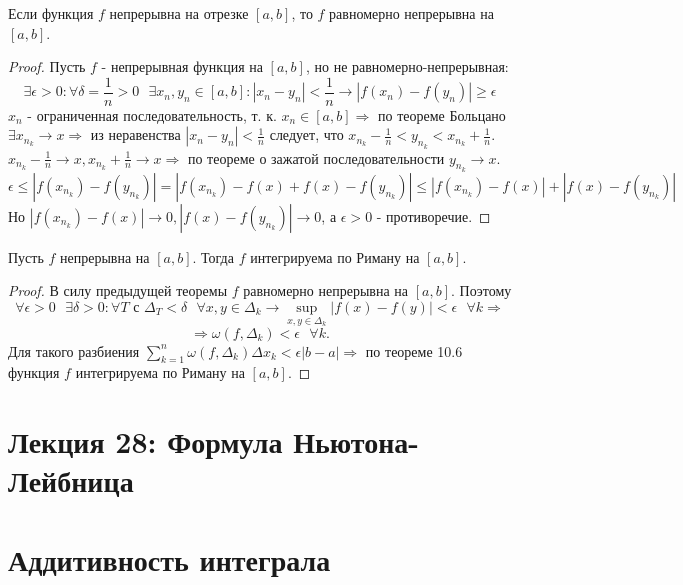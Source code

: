     \begin{theorem}[Кантора]
    	Если функция $f$ непрерывна на отрезке $[a, b]$, то $f$ равномерно непрерывна на $[a, b]$.
    \end{theorem}
    
    \begin{proof}
    	Пусть $f$ - непрерывная функция на $[a, b]$, но не равномерно-непрерывная:
    	\[ \exists \epsilon > 0: \forall \delta = \frac{1}{n} > 0 \text{ } \exists x_n, y_n \in [a, b]: |x_n - y_n| < \frac{1}{n} \rightarrow |f(x_n) - f(y_n)| \geqslant \epsilon \]
    	$x_n$ - ограниченная последовательность, т. к. $x_n \in [a, b] \Rightarrow$ по теореме Больцано $\exists x_{n_k} \to x \Rightarrow$ из неравенства $|x_n - y_n| < \frac{1}{n}$ следует, что $x_{n_k} - \frac{1}{n} < y_{n_k} < x_{n_k} + \frac{1}{n}$.
    	$x_{n_k} - \frac{1}{n} \to x, x_{n_k} + \frac{1}{n} \to x \Rightarrow$ по теореме о зажатой последовательности $y_{n_k} \to x$.
    	\[ \epsilon \leqslant |f(x_{n_k}) - f(y_{n_k})| = |f(x_{n_k}) - f(x) + f(x) - f(y_{n_k})| \leqslant |f(x_{n_k}) - f(x)| + |f(x) - f(y_{n_k})| \]
    	Но $|f(x_{n_k}) - f(x)| \to 0, |f(x) - f(y_{n_k})| \to 0$, а $\epsilon > 0$ - противоречие.
    \end{proof}
    
    \begin{corollary}
    	Пусть $f$ непрерывна на $[a, b]$. Тогда $f$ интегрируема по Риману на $[a, b]$.
    \end{corollary}
    
    \begin{proof}
    	В силу предыдущей теоремы $f$ равномерно непрерывна на $[a, b]$. Поэтому 
    	\[ \forall \epsilon > 0 \text{ } \exists \delta > 0 : \forall T \text{ с } \Delta_T < \delta \text{ } \forall x, y \in \Delta_k \rightarrow \sup_{x, y \in \Delta_k} {|f(x) - f(y)|} < \epsilon \text{ } \forall k \Rightarrow \]
    	\[ \Rightarrow \omega(f, \Delta_k) < \epsilon \text{ } \forall k.\]
    	Для такого разбиения $\displaystyle \sum_{k = 1}^n \omega(f, \Delta_k) \Delta x_k < \epsilon |b - a| \Rightarrow$ по теореме 10.6 функция $f$ интегрируема по Риману на $[a, b]$.
    \end{proof}
    
    \section*{Лекция 28: Формула Ньютона-Лейбница}
    
    \section{Аддитивность интеграла}
    
